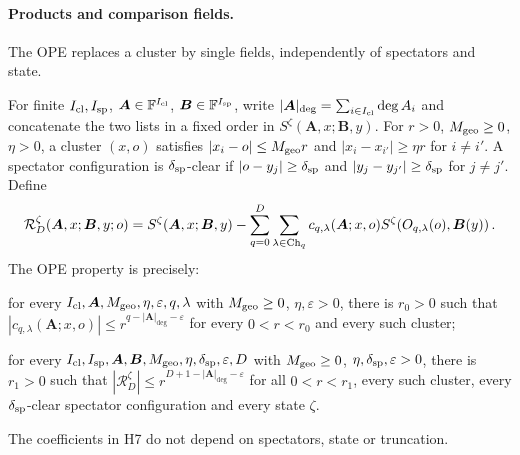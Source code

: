 \paragraph{Products and comparison fields.} The OPE replaces a cluster by single fields, independently of spectators and state.

\begin{definition}\label{def:ope}
For finite $I_{\rm cl},I_{\rm sp}$, $\boldsymbol A\in\mathbb F^{I_{\rm cl}}$, $\boldsymbol B\in\mathbb F^{I_{\rm sp}}$, write $|\boldsymbol A|_{\deg}=\sum_{i\in I_{\rm cl}}\deg A_i$ and concatenate the two lists in a fixed order in $S^\zeta(\boldsymbol A,x;\boldsymbol B,y)$. For $r>0$, $M_{\rm geo}\ge0$, $\eta>0$, a cluster $(x,o)$ satisfies $|x_i-o|\le M_{\rm geo}r$ and $|x_i-x_{i'}|\ge\eta r$ for $i\ne i'$. A spectator configuration is $\delta_{\rm sp}$-clear if $|o-y_j|\ge\delta_{\rm sp}$ and $|y_j-y_{j'}|\ge\delta_{\rm sp}$ for $j\ne j'$. Define
\begin{equation}\label{eq:ope-remainder}
\mathcal R_D^\zeta(\boldsymbol A,x;\boldsymbol B,y;o)=S^\zeta(\boldsymbol A,x;\boldsymbol B,y)-\sum_{q=0}^D\sum_{\lambda\in\mathrm{Ch}_{q}}c_{q,\lambda}(\boldsymbol A;x,o)S^\zeta(O_{q,\lambda}(o),\boldsymbol B(y))\,.
\end{equation}
The OPE property is precisely:

\begin{description}[font=\normalfont,leftmargin=3.8em,labelindent=0pt,nosep]
\item[O1.] for every $I_{\rm cl},\boldsymbol A,M_{\rm geo},\eta,\varepsilon,q,\lambda$ with $M_{\rm geo}\ge0$, $\eta,\varepsilon>0$, there is $r_0>0$ such that $|c_{q,\lambda}(\boldsymbol A;x,o)|\le r^{q-|\boldsymbol A|_{\deg}-\varepsilon}$ for every $0<r<r_0$ and every such cluster;
\item[O2.] for every $I_{\rm cl},I_{\rm sp},\boldsymbol A,\boldsymbol B,M_{\rm geo},\eta,\delta_{\rm sp},\varepsilon,D$ with $M_{\rm geo}\ge0$, $\eta,\delta_{\rm sp},\varepsilon>0$, there is $r_1>0$ such that $|\mathcal R_D^\zeta|\le r^{D+1-|\boldsymbol A|_{\deg}-\varepsilon}$ for all $0<r<r_1$, every such cluster, every $\delta_{\rm sp}$-clear spectator configuration and every state $\zeta$.
\end{description}
\end{definition}

The coefficients in H7 do not depend on spectators, state or truncation.

